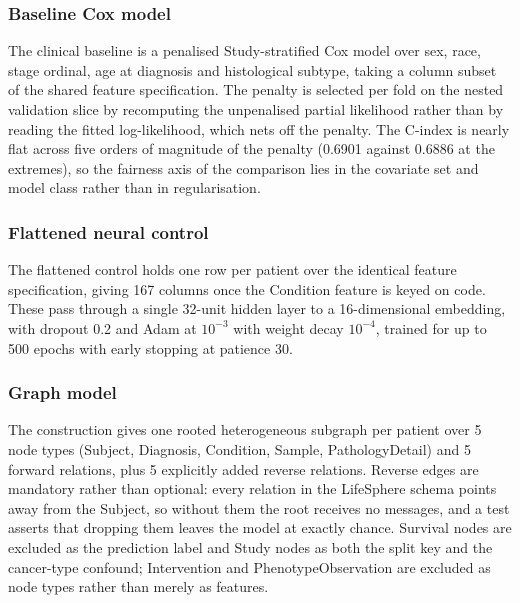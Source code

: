 \subsubsection{Baseline Cox model}

The clinical baseline is a penalised Study-stratified Cox model over sex, race, stage ordinal, age at diagnosis and histological subtype, taking a column subset of the shared feature specification. The penalty is selected per fold on the nested validation slice by recomputing the unpenalised partial likelihood rather than by reading the fitted log-likelihood, which nets off the penalty. The C-index is nearly flat across five orders of magnitude of the penalty (0.6901 against 0.6886 at the extremes), so the fairness axis of the comparison lies in the covariate set and model class rather than in regularisation.

\subsubsection{Flattened neural control}

The flattened control holds one row per patient over the identical feature specification, giving 167 columns once the Condition feature is keyed on code. These pass through a single 32-unit hidden layer to a 16-dimensional embedding, with dropout 0.2 and Adam at $10^{-3}$ with weight decay $10^{-4}$, trained for up to 500 epochs with early stopping at patience 30.

\subsubsection{Graph model}

The construction gives one rooted heterogeneous subgraph per patient over 5 node types (Subject, Diagnosis, Condition, Sample, PathologyDetail) and 5 forward relations, plus 5 explicitly added reverse relations. Reverse edges are mandatory rather than optional: every relation in the LifeSphere schema points away from the Subject, so without them the root receives no messages, and a test asserts that dropping them leaves the model at exactly chance. Survival nodes are excluded as the prediction label and Study nodes as both the split key and the cancer-type confound; Intervention and PhenotypeObservation are excluded as node types rather than merely as features.


